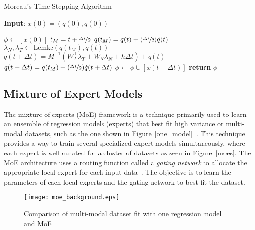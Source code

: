 \begin{algorithm}[tb]
    \caption{Moreau's Time Stepping Algorithm}
    \label{algo:moreau}
    \small
    \hspace*{\algorithmicindent} \textbf{Input}: $x(0) = (q(0), \dot{q}(0))$
    \begin{algorithmic}[1]
      \State $\phi \leftarrow  [x(0)]$ 
           
            \State $t_M = t + \nicefrac{\Delta t}{2}$
            \State $q(t_M) = q(t) +  (\nicefrac{\Delta t}{2}) \dot{q}(t) $
            \State $\lambda_N, \lambda_T \leftarrow \text{Lemke}(q(t_M), \dot{q}(t))$ 
            \State $\dot{q}(t+\Delta t) = M^{-1}(W_T^\top \lambda_T + W_N^\top \lambda_N + h\Delta t) + \dot{q}(t)$
            \State $q(t + \Delta t) =  q(t_M) +  (\nicefrac{\Delta t}{2})\dot{q}(t+\Delta t)$
            \State $\phi \leftarrow \phi \cup [x(t+\Delta t)]$
          \EndFor
        \State \textbf{return} $\phi$
    \end{algorithmic}
\end{algorithm}
%

\subsection{Mixture of Expert Models}
\label{ssec:mixture_of_experts}


The mixture of experts (MoE) framework is a technique primarily used to learn an
ensemble of regression models (experts) that best fit high variance or
multi-modal datasets, such as the one shown in
Figure~\ref{one_model}~\cite{bishop2006pattern}.
%
This technique provides a way to train several specialized expert models
simultaneously, where each expert is well curated for a cluster of datasets as
seen in Figure~\ref{moes}.
%
The MoE architecture uses a routing function called a \textit{gating network} to
allocate the appropriate local expert for each input
data~\cite{harkonen2022mixtures}.
%
The objective is to learn the parameters of each local experts and the gating
network to best fit the dataset.
%
\begin{figure}[tb]
  \centering
  \texttt{[image: moe\_background.eps]}
   \caption{Comparison of multi-modal dataset
  fit with one regression model and MoE }{\hspace{0.5\linewidth}}
  \label{fig:oldfaithful}
\end{figure}

